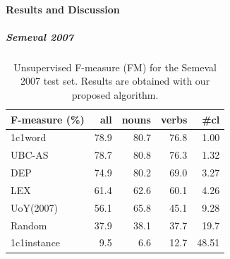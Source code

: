 %



\paragraph{Results and Discussion}
\subparagraph{Semeval 2007}

\begin{table}[!htb]
\centering
\caption{Unsupervised F-measure (FM) for the Semeval 2007 test set. Results are obtained with our proposed algorithm.}
\begin{tabular}{@{}lrrrr@{}}
\toprule
\textbf{F-measure (\%)} & \textbf{all} & \textbf{nouns} & \textbf{verbs} & \textbf{\#cl} \\ \midrule
1c1word          & 78.9         & 80.7           & 76.8           & 1.00             \\
UBC-AS           & 78.7         & 80.8           & 76.3           & 1.32          \\
DEP     & 74.9         & 80.2           & 69.0           & 3.27          \\
LEX     & 61.4         & 62.6           & 60.1           & 4.26         \\
UoY(2007)        & 56.1         & 65.8           & 45.1           & 9.28          \\
Random           & 37.9         & 38.1           & 37.7           & 19.7             \\
1c1instance & 	9.5         & 6.6           & 12.7           & 48.51             \\ \bottomrule
\end{tabular}

\label{tab:sem2007_unsup_FS}
\end{table}

